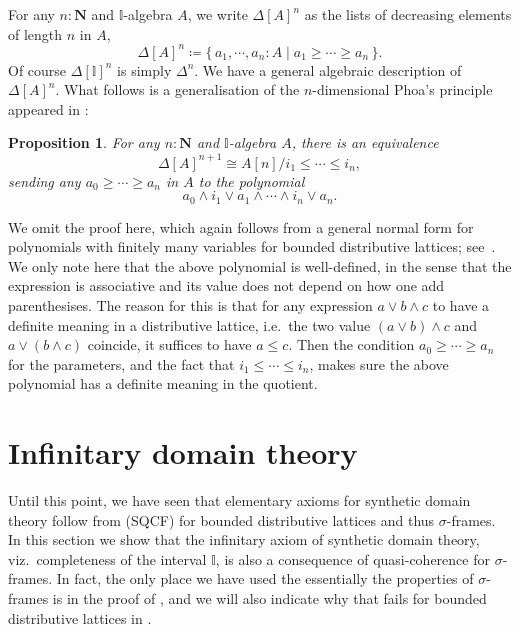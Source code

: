 \documentclass[a4paper,12pt]{amsart}
\newtheorem{proposition}[theorem]{Proposition}
\theoremstyle{definition}
\newcommand{\mb}[1]{\mathbf{#1}}
\newcommand{\mbb}[1]{\mathbb{#1}}
\newcommand{\I}{\mbb I}
\newcommand{\scomp}[2]{\{\,#1\mid#2\,\}}
\newcommand{\N}{\mb N}
\begin{document}
For any $n : \N$ and $\I$-algebra $A$, we write $\Delta[A]^{n}$ as the lists of decreasing elements of length $n$ in $A$,
\[ \Delta[A]^{n} \coloneq \scomp{a_1,\cdots,a_n : A}{a_1 \ge \cdots \ge a_n}. \]
Of course $\Delta[\I]^n$ is simply $\Delta^n$. We have a general algebraic description of $\Delta[A]^n$. What follows is a generalisation of the $n$-dimensional Phoa's principle appeared in \cite{pugh2025partialmapclassifiersierpinski}:

\begin{proposition}\label{prop:simplicesasalgebra}
  For any $n : \N$ and $\I$-algebra $A$, there is an equivalence 
  \[ \Delta[A]^{n+1} \cong A[n]/i_1 \le \cdots \le i_n, \]
  sending any $a_0 \ge \cdots \ge a_n$ in $A$ to the polynomial 
  \[ a_0 \wedge i_1 \vee a_1 \wedge \cdots \wedge i_n \vee a_n. \]
\end{proposition}

We omit the proof here, which again follows from a general normal form for polynomials with finitely many variables for bounded distributive lattices; see~\cite[Thm. 10.21]{lausch2000algebra}. We only note here that the above polynomial is well-defined, in the sense that the expression is associative and its value does not depend on how one add parenthesises. The reason for this is that for any expression $a \vee b \wedge c$ to have a definite meaning in a distributive lattice, i.e.\ the two value $(a \vee b) \wedge c$ and $a \vee (b \wedge c)$ coincide, it suffices to have $a \le c$. Then the condition $a_0 \ge \cdots \ge a_n$ for the parameters, and the fact that $i_1 \le \cdots \le i_n$, makes sure the above polynomial has a definite meaning in the quotient.

\section{Infinitary domain theory}\label{sec:infdomain}

Until this point, we have seen that elementary axioms for synthetic domain theory follow from (SQCF) for bounded distributive lattices and thus $\sigma$-frames. In this section we show that the infinitary axiom of synthetic domain theory, viz.\ completeness of the interval $\I$, is also a consequence of quasi-coherence for $\sigma$-frames. In fact, the only place we have used the essentially the properties of $\sigma$-frames is in the proof of , and we will also indicate why that fails for bounded distributive lattices in .
\end{document}
